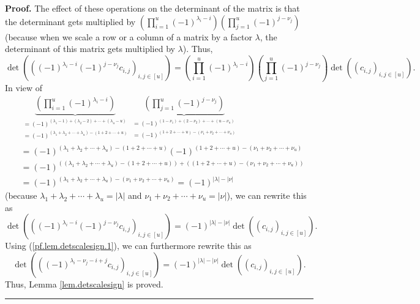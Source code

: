 \documentclass[numbers=enddot,12pt,final,onecolumn,notitlepage]{scrartcl}%
\numberwithin{exer}{section}
\theoremstyle{definition}
\newenvironment{proof}[1][Proof]{\noindent\textbf{#1.} }{\ \rule{0.5em}{0.5em}}
\let\prodnonlimits\prod
\renewcommand{\prod}{\prodnonlimits\limits}
\theoremstyle{plainsl}
\begin{document}
\begin{proof}
The effect of these operations on the determinant of the matrix is that the
determinant gets multiplied by $\left(  \prod_{i=1}^{u}\left(  -1\right)
^{\lambda_{i}-i}\right)  \left(  \prod_{j=1}^{u}\left(  -1\right)  ^{j-\nu
_{j}}\right)  $ (because when we scale a row or a column of a matrix by a
factor $\lambda$, the determinant of this matrix gets multiplied by $\lambda
$). Thus,%
\[
\det\left(  \left(  \left(  -1\right)  ^{\lambda_{i}-i}\left(  -1\right)
^{j-\nu_{j}}c_{i,j}\right)  _{i,j\in\left[  u\right]  }\right)  =\left(
\prod_{i=1}^{u}\left(  -1\right)  ^{\lambda_{i}-i}\right)  \left(  \prod
_{j=1}^{u}\left(  -1\right)  ^{j-\nu_{j}}\right)  \det\left(  \left(
c_{i,j}\right)  _{i,j\in\left[  u\right]  }\right)  .
\]
In view of%
\begin{align*}
&  \underbrace{\left(  \prod_{i=1}^{u}\left(  -1\right)  ^{\lambda_{i}%
-i}\right)  }_{\substack{=\left(  -1\right)  ^{\left(  \lambda_{1}-1\right)
+\left(  \lambda_{2}-2\right)  +\cdots+\left(  \lambda_{u}-u\right)
}\\=\left(  -1\right)  ^{\left(  \lambda_{1}+\lambda_{2}+\cdots+\lambda
_{u}\right)  -\left(  1+2+\cdots+u\right)  }}}\underbrace{\left(  \prod
_{j=1}^{u}\left(  -1\right)  ^{j-\nu_{j}}\right)  }_{\substack{=\left(
-1\right)  ^{\left(  1-\nu_{1}\right)  +\left(  2-\nu_{2}\right)
+\cdots+\left(  u-\nu_{u}\right)  }\\=\left(  -1\right)  ^{\left(
1+2+\cdots+u\right)  -\left(  \nu_{1}+\nu_{2}+\cdots+\nu_{u}\right)  }}}\\
&  =\left(  -1\right)  ^{\left(  \lambda_{1}+\lambda_{2}+\cdots+\lambda
_{u}\right)  -\left(  1+2+\cdots+u\right)  }\left(  -1\right)  ^{\left(
1+2+\cdots+u\right)  -\left(  \nu_{1}+\nu_{2}+\cdots+\nu_{u}\right)  }\\
&  =\left(  -1\right)  ^{\left(  \left(  \lambda_{1}+\lambda_{2}%
+\cdots+\lambda_{u}\right)  -\left(  1+2+\cdots+u\right)  \right)  +\left(
\left(  1+2+\cdots+u\right)  -\left(  \nu_{1}+\nu_{2}+\cdots+\nu_{u}\right)
\right)  }\\
&  =\left(  -1\right)  ^{\left(  \lambda_{1}+\lambda_{2}+\cdots+\lambda
_{u}\right)  -\left(  \nu_{1}+\nu_{2}+\cdots+\nu_{u}\right)  }=\left(
-1\right)  ^{\left\vert \lambda\right\vert -\left\vert \nu\right\vert }%
\end{align*}
(because $\lambda_{1}+\lambda_{2}+\cdots+\lambda_{u}=\left\vert \lambda
\right\vert $ and $\nu_{1}+\nu_{2}+\cdots+\nu_{u}=\left\vert \nu\right\vert
$), we can rewrite this as%
\[
\det\left(  \left(  \left(  -1\right)  ^{\lambda_{i}-i}\left(  -1\right)
^{j-\nu_{j}}c_{i,j}\right)  _{i,j\in\left[  u\right]  }\right)  =\left(
-1\right)  ^{\left\vert \lambda\right\vert -\left\vert \nu\right\vert }%
\det\left(  \left(  c_{i,j}\right)  _{i,j\in\left[  u\right]  }\right)  .
\]
Using (\ref{pf.lem.detscalesign.1}), we can furthermore rewrite this as%
\[
\det\left(  \left(  \left(  -1\right)  ^{\lambda_{i}-\nu_{j}-i+j}%
c_{i,j}\right)  _{i,j\in\left[  u\right]  }\right)  =\left(  -1\right)
^{\left\vert \lambda\right\vert -\left\vert \nu\right\vert }\det\left(
\left(  c_{i,j}\right)  _{i,j\in\left[  u\right]  }\right)  .
\]
Thus, Lemma \ref{lem.detscalesign} is proved.
\end{proof}
\end{document}
